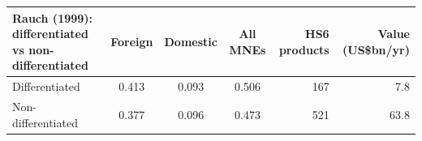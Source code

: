 \begin{tabular}{lcccrr}
\toprule
Rauch (1999): differentiated vs non-differentiated & Foreign & Domestic & All MNEs & HS6 products & Value (US\$bn/yr) \\
\midrule
Differentiated & 0.413 & 0.093 & 0.506 & 167 & 7.8 \\
Non-differentiated & 0.377 & 0.096 & 0.473 & 521 & 63.8 \\
\bottomrule
\end{tabular}
